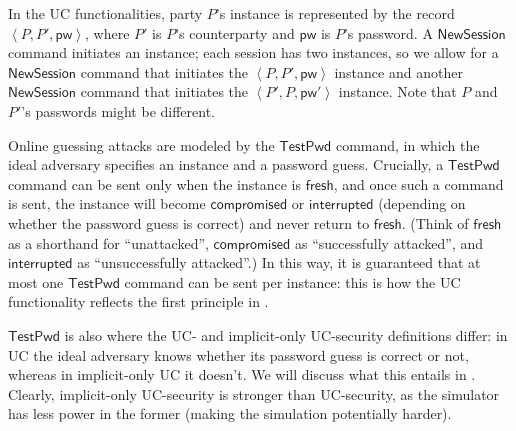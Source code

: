 \documentclass{article}
\newcommand{\pw}{\mathsf{pw}}
\newcommand{\NewSession}{\mathsf{NewSession}}
\newcommand{\TestPwd}{\mathsf{TestPwd}}
\newcommand{\fresh}{\mathsf{fresh}}
\newcommand{\compromised}{\mathsf{compromised}}
\newcommand{\interrupted}{\mathsf{interrupted}}
\begin{document}
In the UC functionalities, party $P$'s instance is represented by the record $\left<P,P',\pw\right>$, where $P'$ is $P$'s counterparty and $\pw$ is $P$'s password. A $\NewSession$ command initiates an instance; each session has two instances, so we allow for a $\NewSession$ command that initiates the $\left<P,P',\pw\right>$ instance and another $\NewSession$ command that initiates the $\left<P',P,\pw'\right>$ instance. Note that $P$ and $P'$'s passwords might be different.

Online guessing attacks are modeled by the $\TestPwd$ command, in which the ideal adversary specifies an instance and a password guess. Crucially, a $\TestPwd$ command can be sent only when the instance is $\fresh$, and once such a command is sent, the instance will become $\compromised$ or $\interrupted$ (depending on whether the password guess is correct) and never return to $\fresh$. (Think of $\fresh$ as a shorthand for ``unattacked'', $\compromised$ as ``successfully attacked'', and $\interrupted$ as ``unsuccessfully attacked''.) In this way, it is guaranteed that at most one $\TestPwd$ command can be sent per instance: this is how the UC functionality reflects the first principle in .

$\TestPwd$ is also where the UC- and implicit-only UC-security definitions differ: in UC the ideal adversary knows whether its password guess is correct or not, whereas in implicit-only UC it doesn't. We will discuss what this entails in . Clearly, implicit-only UC-security is stronger than UC-security, as the simulator has less power in the former (making the simulation potentially harder).
\end{document}

